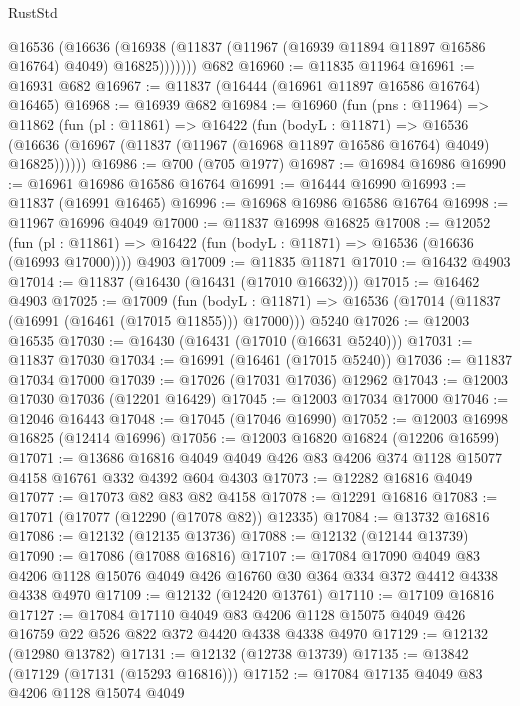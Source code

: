 \begin{lexlean}{RustStd}
\begin{coremodule}
          @16536
            (@16636
              (@16938 (@11837 (@11967 (@16939 @11894 @11897 @16586 @16764) @4049) @16825)))))))
    @682
@16960 := @11835 @11964
@16961 := @16931 @682
@16967 := @11837 (@16444 (@16961 @11897 @16586 @16764) @16465)
@16968 := @16939 @682
@16984 := @16960
    (fun (pns : @11964) =>
    @11862
      (fun (pl : @11861) =>
      @16422
        (fun (bodyL : @11871) =>
        @16536 (@16636 (@16967 (@11837 (@11967 (@16968 @11897 @16586 @16764) @4049) @16825))))))
@16986 := @700 (@705 @1977)
@16987 := @16984 @16986
@16990 := @16961 @16986 @16586 @16764
@16991 := @16444 @16990
@16993 := @11837 (@16991 @16465)
@16996 := @16968 @16986 @16586 @16764
@16998 := @11967 @16996 @4049
@17000 := @11837 @16998 @16825
@17008 := @12052
    (fun (pl : @11861) => @16422 (fun (bodyL : @11871) => @16536 (@16636 (@16993 @17000))))
    @4903
@17009 := @11835 @11871
@17010 := @16432 @4903
@17014 := @11837 (@16430 (@16431 (@17010 @16632)))
@17015 := @16462 @4903
@17025 := @17009
    (fun (bodyL : @11871) => @16536 (@17014 (@11837 (@16991 (@16461 (@17015 @11855))) @17000)))
    @5240
@17026 := @12003 @16535
@17030 := @16430 (@16431 (@17010 (@16631 @5240)))
@17031 := @11837 @17030
@17034 := @16991 (@16461 (@17015 @5240))
@17036 := @11837 @17034 @17000
@17039 := @17026 (@17031 @17036) @12962
@17043 := @12003 @17030 @17036 (@12201 @16429)
@17045 := @12003 @17034 @17000
@17046 := @12046 @16443
@17048 := @17045 (@17046 @16990)
@17052 := @12003 @16998 @16825 (@12414 @16996)
@17056 := @12003 @16820 @16824 (@12206 @16599)
@17071 := @13686
    @16816
    @4049
    @4049
    @426
    @83
    @4206
    @374
    @1128
    @15077
    @4158
    @16761
    @332
    @4392
    @604
    @4303
@17073 := @12282 @16816 @4049
@17077 := @17073 @82 @83 @82 @4158
@17078 := @12291 @16816
@17083 := @17071 (@17077 (@12290 (@17078 @82)) @12335)
@17084 := @13732 @16816
@17086 := @12132 (@12135 @13736)
@17088 := @12132 (@12144 @13739)
@17090 := @17086 (@17088 @16816)
@17107 := @17084
    @17090
    @4049
    @83
    @4206
    @1128
    @15076
    @4049
    @426
    @16760
    @30
    @364
    @334
    @372
    @4412
    @4338
    @4338
    @4970
@17109 := @12132 (@12420 @13761)
@17110 := @17109 @16816
@17127 := @17084
    @17110
    @4049
    @83
    @4206
    @1128
    @15075
    @4049
    @426
    @16759
    @22
    @526
    @822
    @372
    @4420
    @4338
    @4338
    @4970
@17129 := @12132 (@12980 @13782)
@17131 := @12132 (@12738 @13739)
@17135 := @13842 (@17129 (@17131 (@15293 @16816)))
@17152 := @17084
    @17135
    @4049
    @83
    @4206
    @1128
    @15074
    @4049

\end{coremodule}
\end{lexlean}
